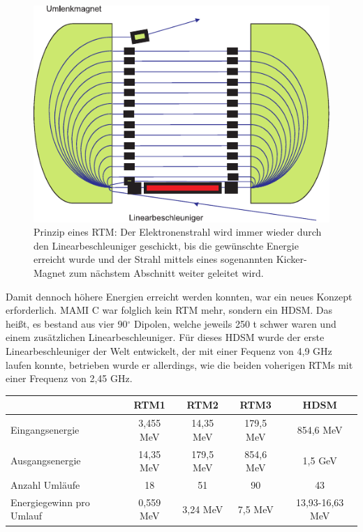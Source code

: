 \documentclass[a4paper,11pt,oneside,final,german,openbib,pdftex]{scrbook}
\begin{document}
{\begin{figure}[h!]
	\begin{center}
	\includegraphics{RTM}	
	\caption{Prinzip eines RTM: Der Elektronenstrahl wird immer wieder durch den Linearbeschleuniger geschickt, bis die gew\"unschte Energie erreicht wurde und der Strahl mittels eines sogenannten Kicker-Magnet zum n\"achstem Abschnitt weiter geleitet wird.\cite{KPh07} }
	\label{fig.RTM}
\end{center}
\end{figure}

Damit dennoch h\"ohere Energien erreicht werden konnten, war ein neues Konzept erforderlich. MAMI C war folglich kein RTM mehr, sondern ein HDSM. Das hei{\ss}t, es bestand aus vier 90$^{\circ}$ Dipolen, welche jeweils 250 t schwer waren und einem zus\"atzlichen Linearbeschleuniger. F\"ur dieses HDSM wurde der erste Linearbeschleuniger der Welt entwickelt, der mit einer Fequenz von 4,9 GHz laufen konnte, betrieben wurde er allerdings, wie die beiden voherigen RTMs mit einer Frequenz von 2,45 GHz.

\begin{table}[h!]
\centering


		\begin{tabular}{|l|c|c|c|c|}
			\hline
			& RTM1 & RTM2 & RTM3 & HDSM \\
			\hline
			\hline
			Eingangsenergie &3,455 MeV  &  14,35 MeV& 179,5 MeV  &854,6 MeV \\ \hline
			Ausgangsenergie &14,35 MeV  &  179,5 MeV &854,6 MeV  & 1,5 GeV \\ \hline
			Anzahl Uml\"aufe&18  &51  &90  &43 \\ \hline
			Energiegewinn pro Umlauf &0,559 MeV  & 3,24 MeV & 7,5 MeV  & 13,93-16,63 MeV \\ \hline
			

\end{tabular}
\end{table}}
\end{document}
